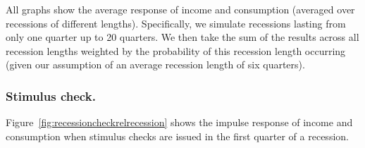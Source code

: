 \documentclass[qe,draft]{econsocart}
\theoremstyle{plain}
\theoremstyle{definition}
\begin{document}
All graphs show the average response of income and consumption (averaged over recessions of different lengths).
Specifically, we simulate recessions lasting from only one quarter up to 20 quarters.
We then take the sum of the results across all recession lengths weighted by the probability of this recession length occurring (given our assumption of an average recession length of six quarters).

\subsubsection{Stimulus check.}

Figure~\ref{fig:recessioncheckrelrecession} shows the impulse response of income and consumption when stimulus checks are issued in the first quarter of a recession.

\vspace{1em}
\FloatBarrier %
\end{document}
